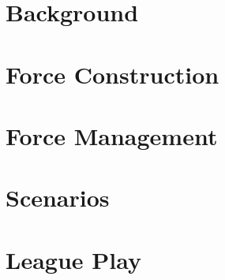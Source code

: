 \documentclass{article}
\begin{document}
\newpage

\section{Background}



\newpage

\section{Force Construction}



\newpage

\section{Force Management}



\newpage

\section{Scenarios}



\newpage

\section{League Play}



\newpage
\end{document}
